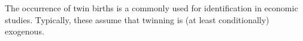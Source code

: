 The occurrence of twin births is a commonly used for identification in economic
studies.  Typically, these assume that twinning is (at least conditionally) 
exogenous.

